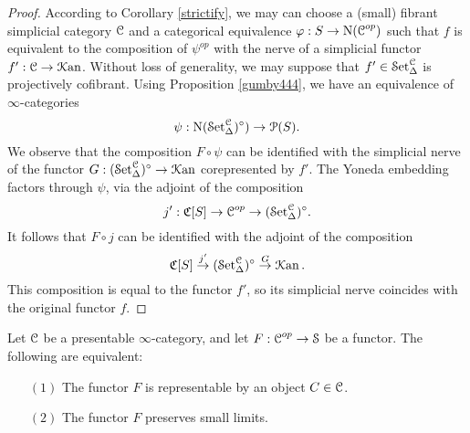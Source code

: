 \begin{proof}
According to Corollary \ref{strictify}, we may can choose a (small) fibrant simplicial category $\operatorname{\mathcal{C}}$ and a categorical equivalence $\varphi: S \rightarrow \operatorname{N}(\operatorname{\mathcal{C}}^{op})$ such that $f$ is equivalent to the composition of $\psi^{op}$ with the nerve of a simplicial functor $f': \operatorname{\mathcal{C}} \rightarrow \operatorname{\mathcal{K}an}$.
Without loss of generality, we may suppose that $f' \in \operatorname{\mathcal{S}et}_{\Delta}^{\operatorname{\mathcal{C}}}$ is projectively cofibrant.
Using Proposition \ref{gumby444}, we have an equivalence of $\infty$-categories
$$ \psi: \operatorname{N} ( \operatorname{\mathcal{S}et}_{\Delta}^{\operatorname{\mathcal{C}}} )^{\circ} ) \rightarrow \operatorname{\mathcal{P}}(S).$$
We observe that the composition $F \circ \psi$ can be identified with
the simplicial nerve of the functor $G: (\operatorname{\mathcal{S}et}_{\Delta}^{\operatorname{\mathcal{C}}})^{\circ} \rightarrow \operatorname{\mathcal{K}an}$
corepresented by $f'$. The Yoneda embedding factors through $\psi$, via the adjoint of the composition
$$ j': \operatorname{\mathfrak{C}}[S] \rightarrow \operatorname{\mathcal{C}}^{op} \rightarrow (\operatorname{\mathcal{S}et}_{\Delta}^{\operatorname{\mathcal{C}}})^{\circ}.$$
It follows that $F \circ j$ can be identified with the adjoint of the composition
$$ \operatorname{\mathfrak{C}}[S] \stackrel{j'}{\rightarrow} ( \operatorname{\mathcal{S}et}_{\Delta}^{\operatorname{\mathcal{C}}} )^{\circ} \stackrel{G}{\rightarrow} \operatorname{\mathcal{K}an}.$$
This composition is equal to the functor $f'$, so its simplicial nerve coincides with the original functor $f$.
\end{proof}

\begin{proposition}\label{representable}
Let $\operatorname{\mathcal{C}}$ be a presentable $\infty$-category, and let 
$F: \operatorname{\mathcal{C}}^{op} \rightarrow \operatorname{\mathcal{S}}$ be a functor. The following are equivalent:
\begin{itemize}
\item[$(1)$] The functor $F$ is representable by an object $C \in \operatorname{\mathcal{C}}$.
\item[$(2)$] The functor $F$ preserves small limits.
\end{itemize}
\end{proposition}

